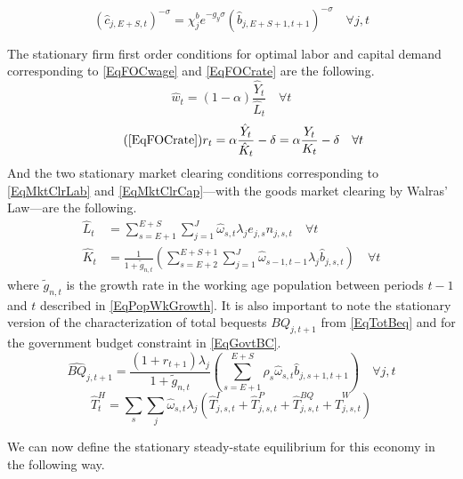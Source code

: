 \documentclass[letterpaper,12pt]{article}
\theoremstyle{definition}
\begin{document}
\begin{spacing}{1.5}
    \begin{equation}\label{EqEulerSavEpSstat}
      (\hat{c}_{j,E+S,t})^{-\sigma} = \chi^b_j e^{-g_y\sigma}(\hat{b}_{j,E+S+1,t+1})^{-\sigma} \quad\forall j,t
    \end{equation}

    The stationary firm first order conditions for optimal labor and capital demand corresponding to \eqref{EqFOCwage} and \eqref{EqFOCrate} are the following.
    \begin{equation}\label{EqFOCwageStat}
       \hat{w}_t = (1-\alpha)\frac{\hat{Y}_t}{\hat{L}_t} \quad \forall t
    \end{equation}
    \begin{equation}\tag{\ref{EqFOCrate}}
       r_t = \alpha\frac{\hat{Y}_t}{\hat{K}_t} - \delta = \alpha\frac{Y_t}{K_t} - \delta \quad \forall t
    \end{equation}
    And the two stationary market clearing conditions corresponding to \eqref{EqMktClrLab} and \eqref{EqMktClrCap}---with the goods market clearing by Walras' Law---are the following.
    \begin{align}
      \hat{L}_t &= \sum_{s=E+1}^{E+S}\sum_{j=1}^{J} \hat{\omega}_{s,t}\lambda_j e_{j,s}n_{j,s,t} \quad \forall t \label{EqMktClrLabStat} \\
      \hat{K}_t &= \frac{1}{1 + \tilde{g}_{n,t}}\left(\sum_{s=E+2}^{E+S+1}\sum_{j=1}^{J}\hat{\omega}_{s-1,t-1}\lambda_j \hat{b}_{j,s,t}\right) \quad \forall t \label{EqMktClrCapStat}
    \end{align}
    where $\tilde{g}_{n,t}$ is the growth rate in the working age population between periods $t-1$ and $t$ described in \eqref{EqPopWkGrowth}. It is also important to note the stationary version of the characterization of total bequests $BQ_{j,t+1}$ from \eqref{EqTotBeq} and for the government budget constraint in \eqref{EqGovtBC}.
    \begin{equation}\label{EqTotBeqStat}
      \hat{BQ}_{j,t+1} = \frac{(1+r_{t+1})\lambda_j}{1+\tilde{g}_{n,t}}\left(\sum_{s=E+1}^{E+S}\rho_s\hat{\omega}_{s,t}\hat{b}_{j,s+1,t+1}\right) \quad\forall j,t
    \end{equation}
    \begin{equation}\label{EqGovtBCstat}
      \hat{T}^H_t = \sum_s \sum_j \hat{\omega}_{s,t}\lambda_j\left(\hat{T}^I_{j,s,t} + \hat{T}^P_{j,s,t} + \hat{T}^{BQ}_{j,s,t} + \hat{T}^W_{j,s,t}\right)
    \end{equation}

    We can now define the stationary steady-state equilibrium for this economy in the following way.

    \vspace{7mm}
    \end{spacing}
\end{document}
